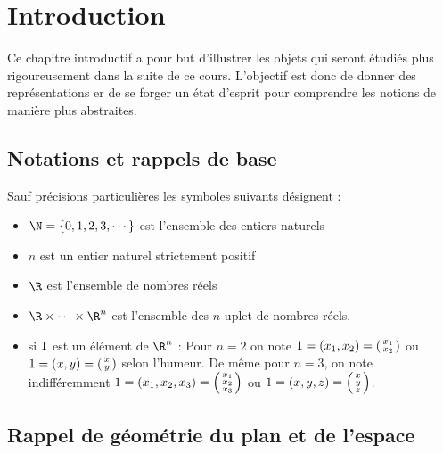 \chapter{Introduction}

Ce chapitre introductif a pour but d'illustrer les objets qui seront étudiés plus rigoureusement dans la suite de ce cours. L'objectif est donc de donner des représentations er de se forger un état d'esprit pour comprendre les notions de manière plus abstraites.    

\section{Notations et rappels de base}

Sauf précisions particulières les symboles suivants désignent :
\begin{itemize}
	\item $\N = \left\{ 0,1,2,3,\cdots \right\}$ est l'ensemble des entiers naturels
	\item $n$ est un entier naturel strictement positif
	\item $\R$ est l'ensemble de nombres réels
	\item $\R\times \cdots \times \R^n$ est l'ensemble des $n$-uplet de nombres réels. 
	\item si $1$ est un élément de $\R^n$ : Pour $n=2$ on note $1= (x_1,x_2)=\begin{psmallmatrix}x_1\\x_2\end{psmallmatrix}$ ou $1=(x,y) = \begin{psmallmatrix}x\\y\end{psmallmatrix}$ selon l'humeur. De même pour $n=3$, on note indifféremment $1=(x_1,x_2,x_3) = \begin{psmallmatrix}x_1\\x_2\\x_3\end{psmallmatrix}$ ou $1=(x,y,z)=\begin{psmallmatrix}x\\y\\z\end{psmallmatrix}$.
\end{itemize}

\section{Rappel de géométrie du plan et de l'espace}

